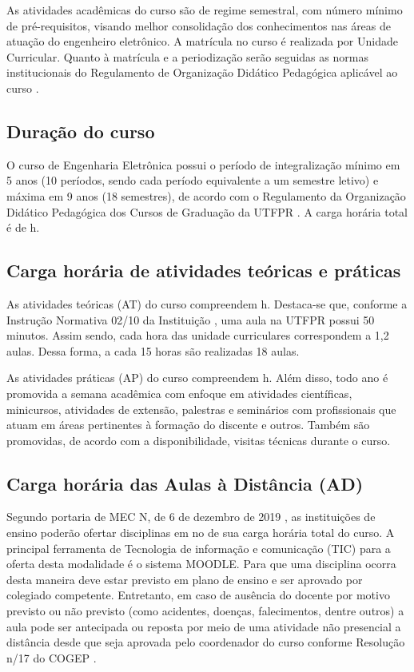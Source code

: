 As atividades acadêmicas do curso são de regime semestral, com número mínimo de pré-requisitos, visando melhor consolidação dos conhecimentos nas áreas de atuação do engenheiro eletrônico. A matrícula no curso é realizada por Unidade Curricular. Quanto à matrícula e a periodização serão seguidas as normas institucionais do Regulamento de Organização Didático Pedagógica aplicável ao curso \cite{rodp}.

\subsection{Duração do curso}

O curso de Engenharia Eletrônica possui o período de integralização mínimo em 5 anos (10 períodos, sendo cada período equivalente a um semestre letivo) e máxima em 9 anos (18 semestres), de acordo com o Regulamento da Organização Didático Pedagógica dos Cursos de Graduação da UTFPR \cite{rodp}. A carga horária total é de \the\value{horasT} h.

\subsection{Carga horária de atividades teóricas e práticas}

As atividades teóricas (AT) do curso compreendem \the\value{horasAT} h. Destaca-se que, conforme a Instrução Normativa 02/10 da Instituição \cite{in2:2010:prograd}, uma aula na UTFPR possui 50 minutos. Assim sendo, cada hora das unidade curriculares correspondem a 1,2 aulas. Dessa forma, a cada 15 horas são realizadas 18 aulas.


As atividades práticas (AP) do curso compreendem \the\value{horasAP} h. Além disso, todo ano é promovida a semana acadêmica com enfoque em atividades científicas, minicursos, atividades de extensão, palestras e seminários com profissionais que atuam em áreas pertinentes à formação do discente e outros. Também são promovidas, de acordo com a disponibilidade, visitas técnicas durante o curso.

\subsection{Carga horária das Aulas à Distância (AD)}

Segundo portaria de MEC N, de 6 de dezembro de 2019 \cite{portaria2117mec}, as instituições de ensino poderão ofertar disciplinas em no  de sua carga horária total do curso. A principal ferramenta de Tecnologia de informação e comunicação (TIC) para a oferta desta modalidade é o sistema MOODLE. Para que uma disciplina ocorra desta maneira deve estar previsto em plano de ensino e ser aprovado por colegiado competente. Entretanto, em caso de ausência do docente por motivo previsto ou não previsto (como acidentes, doenças, falecimentos, dentre outros) a aula pode ser antecipada ou reposta por meio de uma atividade não presencial a distância desde que seja aprovada pelo coordenador do curso conforme Resolução n/17 do COGEP \cite{cogep84}.

